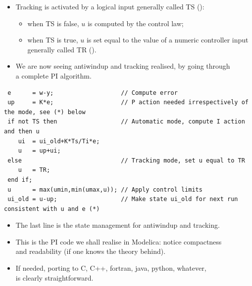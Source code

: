 \begin{frame}
\framesubtitleTC{}
\myPause
 \begin{itemize}[<+-| alert@+>]
 \item Tracking is activated by a logical input generally called TS ():
       \begin{itemize}[<+-| alert@+>]
       \item when TS is false, $u$ is computed by the control law;
       \item when TS is true, $u$ is set equal to the value of a numeric controller input\\
             generally called TR (). 
        \end{itemize}
 \item We are now seeing antiwindup and tracking realised, by going through\\
       a complete PI algorithm.
 \end{itemize}
\end{frame}

\begin{frame}[fragile,label={pag:PI-complete-alg}]
\myPause
 {\scriptsize
 \begin{verbatim}
 e      = w-y;                   // Compute error
 up     = K*e;                   // P action needed irrespectively of the mode, see (*) below
 if not TS then                  // Automatic mode, compute I action and then u
    ui  = ui_old+K*Ts/Ti*e;
    u   = up+ui;
 else                            // Tracking mode, set u equal to TR
    u   = TR;
 end if;
 u      = max(umin,min(umax,u)); // Apply control limits
 ui_old = u-up;                  // Make state ui_old for next run consistent with u and e (*)
 \end{verbatim}
 }\myPause
 \vspace{-3mm}\begin{itemize}[<+-| alert@+>]
 \item The last line is the state management for antiwindup and tracking.
 \item This is the PI code we shall realise in Modelica: notice compactness\\
       and readability (if one knows the theory behind).
 \item If needed, porting to C, C++, fortran, java, python, whatever,\\
       is clearly straightforward. 
 \end{itemize}
\end{frame}


